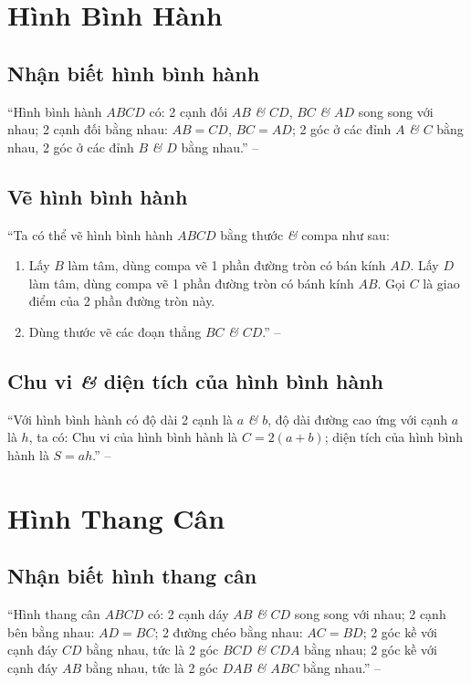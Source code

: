 \documentclass[oneside]{book}
\numberwithin{equation}{section}
\begin{document}
\section{Hình Bình Hành}

\subsection{Nhận biết hình bình hành}
``Hình bình hành $ABCD$ có: 2 cạnh đối $AB$ \textit{\&} $CD$, $BC$ \textit{\&} $AD$ song song với nhau; 2 cạnh đối bằng nhau: $AB = CD$, $BC = AD$; 2 góc ở các đỉnh $A$ \textit{\&} $C$ bằng nhau, 2 góc ở các đỉnh $B$ \textit{\&} $D$ bằng nhau.'' -- \cite[p. 102]{Thai_Anh_Dat_Ha_Loan_Nam_Quang_Toan_6_tap_1}

\subsection{Vẽ hình bình hành}
``Ta có thể vẽ hình bình hành $ABCD$ bằng thước \textit{\&} compa như sau:
\begin{enumerate}
	\item Lấy $B$ làm tâm, dùng compa vẽ 1 phần đường tròn có bán kính $AD$. Lấy $D$ làm tâm, dùng compa vẽ 1 phần đường tròn có bánh kính $AB$. Gọi $C$ là giao điểm của 2 phần đường tròn này.
	\item Dùng thước vẽ các đoạn thẳng $BC$ \textit{\&} $CD$.'' -- \cite[p. 103]{Thai_Anh_Dat_Ha_Loan_Nam_Quang_Toan_6_tap_1}
\end{enumerate}

\subsection{Chu vi \textit{\&} diện tích của hình bình hành}
``Với hình bình hành có độ dài 2 cạnh là $a$ \textit{\&} $b$, độ dài đường cao ứng với cạnh $a$ là $h$, ta có: Chu vi của hình bình hành là $C = 2(a + b)$; diện tích của hình bình hành là $S = ah$.'' -- \cite[p. 103]{Thai_Anh_Dat_Ha_Loan_Nam_Quang_Toan_6_tap_1}


\section{Hình Thang Cân}

\subsection{Nhận biết hình thang cân}
``Hình thang cân $ABCD$ có: 2 cạnh dáy $AB$ \textit{\&} $CD$ song song với nhau; 2 cạnh bên bằng nhau: $AD = BC$; 2 đường chéo bằng nhau: $AC = BD$; 2 góc kề với cạnh đáy $CD$ bằng nhau, tức là 2 góc $BCD$ \textit{\&} $CDA$ bằng nhau; 2 góc kề với cạnh đáy $AB$ bằng nhau, tức là 2 góc $DAB$ \textit{\&} $ABC$ bằng nhau.'' -- \cite[p. 105]{Thai_Anh_Dat_Ha_Loan_Nam_Quang_Toan_6_tap_1}
\end{document}
